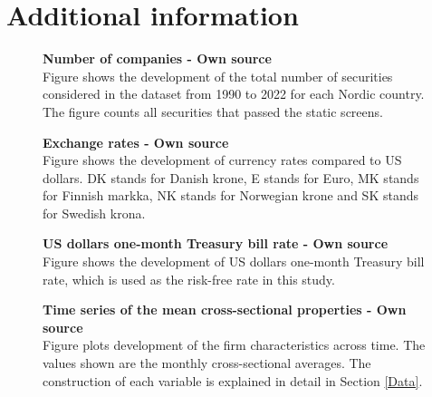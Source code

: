 \documentclass[12pt]{article}
\begin{document}
\clearpage

\section{Additional information}
\renewcommand{\thefigure}{C.\arabic{figure}}
\setcounter{figure}{0}
\renewcommand{\thetable}{C.\arabic{table}}
\setcounter{table}{0}

\begin{figure}[H]
\centering
\caption[Number of companies]{\textbf{Number of companies \textnormal{- Own source}}\\ Figure shows the development of the total number of securities considered in the dataset from 1990 to 2022 for each Nordic country. The figure counts all securities that passed the static screens.}

\label{plot:number_of_companies}
\end{figure}

\begin{figure}[H]
\centering
\caption[Exchange rates]{\textbf{Exchange rates \textnormal{- Own source}}\\ Figure shows the development of currency rates compared to US dollars. DK stands for  Danish krone, E stands for Euro, MK stands for Finnish markka, NK stands for Norwegian krone and SK stands for Swedish krona.}

\label{plot:fx_rates}
\end{figure}

\begin{figure}[H]
\centering
\caption[US dollar one-month Treasury bill rate]{\textbf{US dollars one-month Treasury bill rate \textnormal{- Own source}}\\ Figure shows the development of US dollars one-month Treasury bill rate, which is used as the risk-free rate in this study.}

\label{plot:rf_ts}
\end{figure}

\begin{figure}[H]
\centering
\caption[Time series of the mean cross-sectional properties]{\textbf{Time series of the mean cross-sectional properties \textnormal{- Own source}}\\ Figure plots development of the firm characteristics across time. The values shown are the monthly cross-sectional averages. The construction of each variable is explained in detail in Section \ref{Data}.}

\label{plot:variableTS}
\end{figure}
\end{document}
